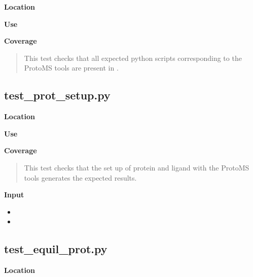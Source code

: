 \documentclass[letterpaper,10pt,english]{manual}
\begin{document}
\textbf{Location}
\begin{quote}

\end{quote}

\textbf{Use}
\begin{quote}

\end{quote}

\textbf{Coverage}
\begin{quote}

This test checks that all expected python scripts corresponding to the ProtoMS tools are present in .
\end{quote}


\subsection{test\_prot\_setup.py}

\textbf{Location}
\begin{quote}

\end{quote}

\textbf{Use}
\begin{quote}

\end{quote}

\textbf{Coverage}
\begin{quote}

This test checks that the set up of protein and ligand with the ProtoMS tools generates the expected results.
\end{quote}

\textbf{Input}
\begin{itemize}
\item {} 

\item {} 

\end{itemize}


\subsection{test\_equil\_prot.py}

\textbf{Location}
\begin{quote}

\end{quote}
\end{document}
